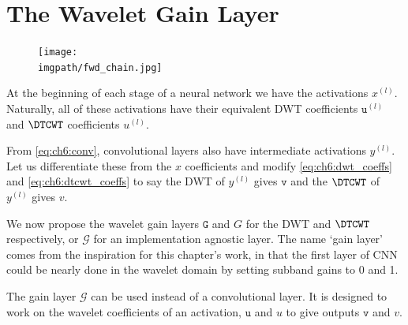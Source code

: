 \section{The Wavelet Gain Layer}

\begin{figure}[t]
  \centering
  \texttt{[image: \\imgpath/fwd\_chain.jpg]}
  \label{fig:ch6:fwd_chain}
\end{figure}


At the beginning of each stage of a neural network we have the activations
$x^{(l)}$. Naturally, all of these activations have their equivalent DWT 
coefficients $\mathtt{u}^{(l)}$ and $\DTCWT$ coefficients $u^{(l)}$. 

From \eqref{eq:ch6:conv}, convolutional layers also have intermediate
activations $y^{(l)}$. Let us differentiate these from the $x$ coefficients and
modify \eqref{eq:ch6:dwt_coeffs} and \eqref{eq:ch6:dtcwt_coeffs} to say the DWT
of $y^{(l)}$ gives $\mathtt{v}$ and the $\DTCWT$ of $y^{(l)}$ gives $v$.

We now propose the wavelet gain layers $\mathtt{G}$ and $G$ for the DWT and
$\DTCWT$ respectively, or $\mathcal{G}$ for an implementation agnostic layer.
The name `gain layer' comes from the inspiration for this chapter's work, in
that the first layer of CNN could be nearly done in the wavelet domain by
setting subband gains to 0 and 1. 

The gain layer $\mathcal{G}$ can be used instead of a convolutional layer. 
It is designed to work on the wavelet coefficients of an activation,
$\mathtt{u}$ and $u$ to give outputs $\mathtt{v}$ and $v$. 

